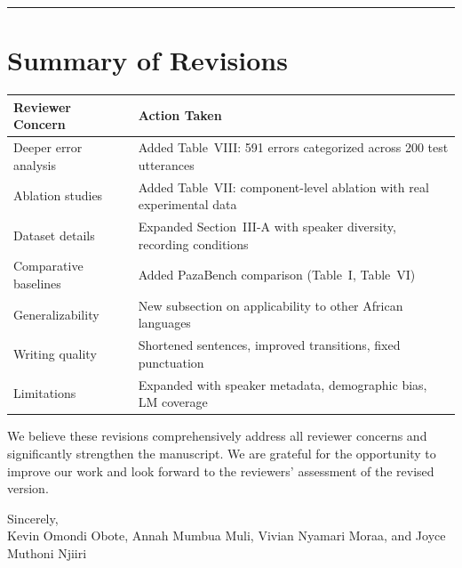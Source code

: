 \documentclass[11pt]{article}
\begin{document}
\vspace{1.5em}
\hrule
\vspace{1em}

\section*{Summary of Revisions}

\begin{table}[h]
\centering
\small
\begin{tabular}{@{}p{}p{}@{}}
\toprule
\textbf{Reviewer Concern} & \textbf{Action Taken} \\
\midrule
Deeper error analysis & Added Table~VIII: 591 errors categorized across 200 test utterances \\
\addlinespace
Ablation studies & Added Table~VII: component-level ablation with real experimental data \\
\addlinespace
Dataset details & Expanded Section~III-A with speaker diversity, recording conditions \\
\addlinespace
Comparative baselines & Added PazaBench comparison (Table~I, Table~VI) \\
\addlinespace
Generalizability & New subsection on applicability to other African languages \\
\addlinespace
Writing quality & Shortened sentences, improved transitions, fixed punctuation \\
\addlinespace
Limitations & Expanded with speaker metadata, demographic bias, LM coverage \\
\bottomrule
\end{tabular}
\end{table}

\vspace{1em}

\noindent We believe these revisions comprehensively address all reviewer concerns and significantly strengthen the manuscript. We are grateful for the opportunity to improve our work and look forward to the reviewers' assessment of the revised version.

\vspace{1.5em}

\noindent Sincerely,\\
Kevin Omondi Obote, Annah Mumbua Muli, Vivian Nyamari Moraa, and Joyce Muthoni Njiiri
\end{document}
